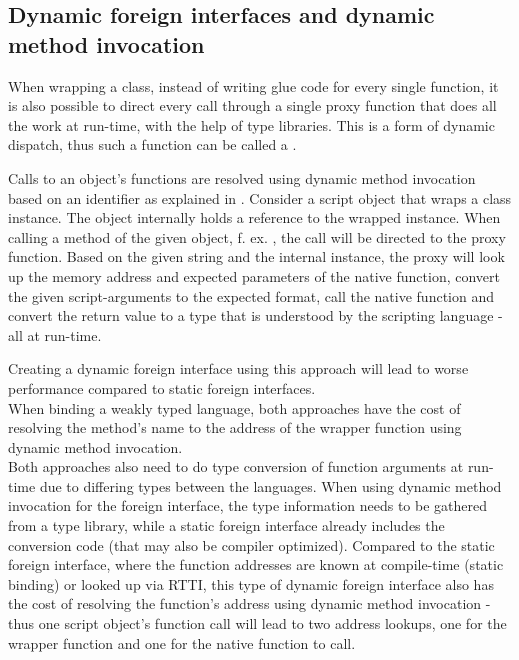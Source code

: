 
\subsection{Dynamic foreign interfaces and dynamic method invocation}
\label{sec:DynamicForeignInterfaces}

When wrapping a class, instead of writing glue code for every single function, it is also possible to direct every call through a single proxy function that does all the work at run-time, with the help of type libraries. This is a form of dynamic dispatch, thus such a function can be called a .

Calls to an object's functions are resolved using dynamic method invocation based on an identifier as explained in . Consider a script object that wraps a class instance. The object internally holds a reference to the wrapped instance. When calling a method of the given object, f. ex. , the call will be directed to the proxy function. Based on the given string  and the internal instance, the proxy will look up the memory address and expected parameters of the native function, convert the given script-arguments to the expected format, call the native function and convert the return value to a type that is understood by the scripting language - all at run-time.

Creating a dynamic foreign interface using this approach will lead to worse performance compared to static foreign interfaces.\\
When binding a weakly typed language, both approaches have the cost of resolving the method's name to the address of the wrapper function using dynamic method invocation.\\
Both approaches also need to do type conversion of function arguments at run-time due to differing types between the languages. When using dynamic method invocation for the foreign interface, the type information needs to be gathered from a type library, while a static foreign interface already includes the conversion code (that may also be compiler optimized). Compared to the static foreign interface, where the function addresses are known at compile-time (static binding) or looked up via RTTI, this type of dynamic foreign interface also has the cost of resolving the function's address using dynamic method invocation - thus one script object's function call will lead to two address lookups, one for the wrapper function and one for the native function to call.

